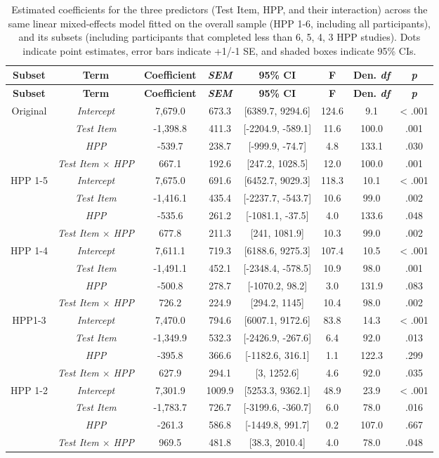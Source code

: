 \documentclass[english,man,man,floatsintext]{apa6}
\begin{document}
\begin{appendix}
\begin{longtable}[]{@{}cccccccc@{}}
\caption{\label{tab:unnamed-chunk-15}Estimated coefficients for the three
predictors (Test Item, HPP, and their interaction) across the same
linear mixed-effects model fitted on the overall sample (HPP 1-6,
including all participants), and its subsets (including participants
that completed less than 6, 5, 4, 3 HPP studies). Dots indicate point
estimates, error bars indicate +1/-1 SE, and shaded boxes indicate 95\%
CIs.}\tabularnewline
\toprule
\textbf{Subset} & \textbf{Term} & \textbf{Coefficient} &
\textbf{\emph{SEM}} & \textbf{95\% CI} & \textbf{F} & \textbf{Den.
\emph{df}} & \textbf{\emph{p}}\tabularnewline
\midrule
\endfirsthead
\toprule
\textbf{Subset} & \textbf{Term} & \textbf{Coefficient} &
\textbf{\emph{SEM}} & \textbf{95\% CI} & \textbf{F} & \textbf{Den.
\emph{df}} & \textbf{\emph{p}}\tabularnewline
\midrule
\endhead
Original & \emph{Intercept} & 7,679.0 & 673.3 & {[}6389.7, 9294.6{]} &
124.6 & 9.1 & \textless{} .001\tabularnewline
& \emph{Test Item} & -1,398.8 & 411.3 & {[}-2204.9, -589.1{]} & 11.6 &
100.0 & .001\tabularnewline
& \emph{HPP} & -539.7 & 238.7 & {[}-999.9, -74.7{]} & 4.8 & 133.1 &
.030\tabularnewline
& \emph{Test Item \(\times\) HPP} & 667.1 & 192.6 & {[}247.2, 1028.5{]}
& 12.0 & 100.0 & .001\tabularnewline
HPP 1-5 & \emph{Intercept} & 7,675.0 & 691.6 & {[}6452.7, 9029.3{]} &
118.3 & 10.1 & \textless{} .001\tabularnewline
& \emph{Test Item} & -1,416.1 & 435.4 & {[}-2237.7, -543.7{]} & 10.6 &
99.0 & .002\tabularnewline
& \emph{HPP} & -535.6 & 261.2 & {[}-1081.1, -37.5{]} & 4.0 & 133.6 &
.048\tabularnewline
& \emph{Test Item \(\times\) HPP} & 677.8 & 211.3 & {[}241, 1081.9{]} &
10.3 & 99.0 & .002\tabularnewline
HPP 1-4 & \emph{Intercept} & 7,611.1 & 719.3 & {[}6188.6, 9275.3{]} &
107.4 & 10.5 & \textless{} .001\tabularnewline
& \emph{Test Item} & -1,491.1 & 452.1 & {[}-2348.4, -578.5{]} & 10.9 &
98.0 & .001\tabularnewline
& \emph{HPP} & -500.8 & 278.7 & {[}-1070.2, 98.2{]} & 3.0 & 131.9 &
.083\tabularnewline
& \emph{Test Item \(\times\) HPP} & 726.2 & 224.9 & {[}294.2, 1145{]} &
10.4 & 98.0 & .002\tabularnewline
HPP1-3 & \emph{Intercept} & 7,470.0 & 794.6 & {[}6007.1, 9172.6{]} &
83.8 & 14.3 & \textless{} .001\tabularnewline
& \emph{Test Item} & -1,349.9 & 532.3 & {[}-2426.9, -267.6{]} & 6.4 &
92.0 & .013\tabularnewline
& \emph{HPP} & -395.8 & 366.6 & {[}-1182.6, 316.1{]} & 1.1 & 122.3 &
.299\tabularnewline
& \emph{Test Item \(\times\) HPP} & 627.9 & 294.1 & {[}3, 1252.6{]} &
4.6 & 92.0 & .035\tabularnewline
HPP 1-2 & \emph{Intercept} & 7,301.9 & 1009.9 & {[}5253.3, 9362.1{]} &
48.9 & 23.9 & \textless{} .001\tabularnewline
& \emph{Test Item} & -1,783.7 & 726.7 & {[}-3199.6, -360.7{]} & 6.0 &
78.0 & .016\tabularnewline
& \emph{HPP} & -261.3 & 586.8 & {[}-1449.8, 991.7{]} & 0.2 & 107.0 &
.667\tabularnewline
& \emph{Test Item \(\times\) HPP} & 969.5 & 481.8 & {[}38.3, 2010.4{]} &
4.0 & 78.0 & .048\tabularnewline
\bottomrule
\end{longtable}


\end{appendix}
\end{document}
